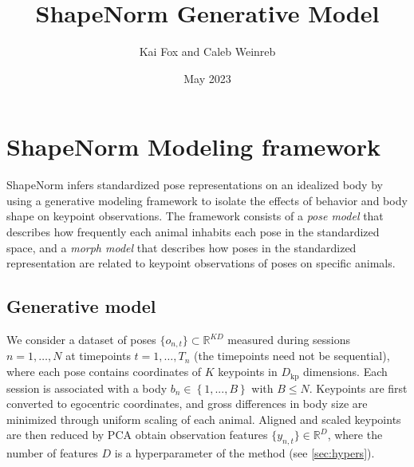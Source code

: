 \documentclass{article}         %
\title{ShapeNorm Generative Model}
\author{Kai Fox and Caleb Weinreb}
\date{May 2023}
\newcommand{\RR}{\mathbb{R}}
\newcommand{\cb}[1]{\left\{ #1 \right\}}
\begin{document}
\maketitle

\section{ShapeNorm Modeling framework}
\label{sec:model-fwk}

ShapeNorm infers standardized pose representations on an idealized body by
using a generative modeling framework to isolate the effects of behavior and
body shape on keypoint observations. The framework consists of a \textit{pose
model} that describes how frequently each animal inhabits each pose in the
standardized space, and a \textit{morph model} that describes how poses in the standardized representation are related to keypoint observations of poses on specific animals.


\subsection{Generative model}
\label{sec:gen-model}

We consider a dataset of poses $\{o_{n,t}\} \subset \mathbb{R}^{KD}$ measured during sessions $n=1,\dots,N$ at timepoints $t=1,\dots,T_n$ (the timepoints need not be sequential), where each pose contains coordinates of $K$ keypoints in $D_{\text{kp}}$ dimensions. Each session is associated with a body $b_n\in \cb{1,...,B}$ with $B\leq N$. Keypoints are first converted to egocentric coordinates, and gross differences in body size are minimized through uniform scaling of each animal. Aligned and scaled keypoints are then reduced by PCA obtain observation features $\{y_{n, t}\}\in \RR^D$, where the number of features $D$ is a hyperparameter of the method (see \ref{sec:hypers}).
\end{document}
